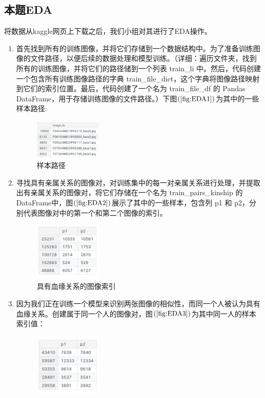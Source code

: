 \documentclass[UTF8]{ctexart}
\begin{document}
\subsection{本题EDA}%
将数据从kaggle网页上下载之后，我们小组对其进行了EDA操作。
\begin{enumerate}
  \item 首先找到所有的训练图像，并将它们存储到一个数据结构中。为了准备训练图像的文件路径，以便后续的数据处理和模型训练。（详细：遍历文件夹，找到所有的训练图像，并将它们的路径储到一个列表 train\_li 中。然后，代码创建一个包含所有训练图像路径的字典
  train\_file\_dict，这个字典将图像路径映射到它们的索引位置。最后，代码创建了一个名为 train\_file\_df 的 Pandas DataFrame，用于存储训练图像的文件路径。）下图$\left(\ref{fig:EDA1}\right)$为其中的一些样本路径:
  \begin{figure}[!ht]
    \centering
    \includegraphics[width=0.3\textwidth]{EDA1.png}
    \caption{样本路径}
    \label{fig:EDA1}
  \end{figure}
  \item 寻找具有亲属关系的图像对，对训练集中的每一对亲属关系进行处理，并提取出有亲属关系的图像对，将它们存储在一个名为 
  train\_pairs\_kinship 的DataFrame中，图$\left(\ref{fig:EDA2}\right)$展示了其中的一些样本，包含列 p1 和 p2，分别代表图像对中的第一个和第二个图像的索引。
  \begin{figure}[!ht]
    \centering
    \includegraphics[width=0.3\textwidth]{EDA2.png}
    \caption{具有血缘关系的图像索引}
    \label{fig:EDA2}
  \end{figure}
  \item 因为我们正在训练一个模型来识别两张图像的相似性，而同一个人被认为具有血缘关系。创建属于同一个人的图像对，图$\left(\ref{fig:EDA3}\right)$为其中同一人的样本索引值：
  \begin{figure}[!ht]
    \centering
    \includegraphics[width=0.3\textwidth]{EDA3.png}

\end{figure}
\end{enumerate}
\end{document}
